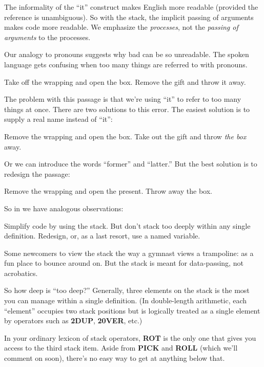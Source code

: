 The informality of the ``it'' construct makes English more readable
(provided the reference is unambiguous). So with the stack, the implicit
passing of arguments makes code more readable. We emphasize the
\emph{processes}, not the \emph{passing of arguments} to the processes.

Our analogy to pronouns suggests why bad \Forth{} can be so unreadable.
The spoken language gets confusing when too many things are
referred to with pronouns.

\begin{tfquot}
Take off the wrapping and open the box. Remove the gift and throw it
away.
\end{tfquot}
The problem with this passage is that we're using ``it'' to refer to too
many things at once. There are two solutions to this error. The easiest
solution is to supply a real name instead of ``it'':

\begin{tfquot}
Remove the wrapping and open the box. Take out the gift and throw
\emph{the box} away.
\end{tfquot}
Or we can introduce the words ``former'' and ``latter.'' But the best
solution is to redesign the passage:

\begin{tfquot}
Remove the wrapping and open the present. Throw away the box.
\end{tfquot}
So in \Forth{} we have analogous observations:

\begin{tip}
Simplify code by using the stack. But don't stack too deeply within any
single definition. Redesign, or, as a last resort, use a named variable.
\end{tip}
Some newcomers to \Forth{} view the stack the way a gymnast views a
trampoline: as a fun place to bounce around on. But the stack is meant for
data-passing, not acrobatics.

So how deep is ``too deep?'' Generally, three elements on the stack is
the most you can manage within a single definition. (In double-length
arithmetic, each ``element'' occupies two stack positions but is logically
treated as a single element by operators such as \textbf{2DUP}, \textbf{20VER},
etc.)

In your ordinary lexicon of stack operators, \textbf{ROT} is the only one
that gives you access to the third stack item. Aside from \textbf{PICK} and
\textbf{ROLL} (which we'll comment on soon), there's no easy way to get at
anything below that.

